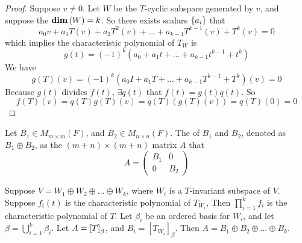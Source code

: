 \begin{proof}
    Suppose $v \neq 0$. Let $W$ be the $T$-cyclic subspace generated by $v$, and suppose the $\displaystyle \mathbf{dim}\left( W \right) =k$. So there exists scalars $\set{a_i}$ that 
    \begin{equation*}
        a_0 v + a_1 T(v) + a_2 T^2(v) + \dots + a_{k-1} T^{k-1}(v) + T^k(v) = 0
    \end{equation*}
    which implies the characteristic polynomial of $T_W$ is
    \begin{equation*}
        g(t) = (-1)^k \left(a_0 + a_1 t + \dots + a_{k-1} t^{k-1} + t^k \right)
    \end{equation*}
    We have
    \begin{equation*}
        g(T)(v) = (-1)^k \left(a_0 I + a_1 T + \dots + a_{k-1} T^{k-1} + T^k \right)(v) = 0
    \end{equation*}
    Because $g(t)$ divides $f(t)$, $\exists q(t)$ that $f(t) = g(t) q(t)$. So
    \begin{equation*}
        f(T)(v) = q(T)g(T)(v) = q(T) \left(g(T)(v)\right) = q(T)(0) = 0
    \end{equation*}
\end{proof}



\begin{definition}
    Let $B_1 \in M_{m \times m}(F)$, and $B_2 \in M_{n \times n} (F)$. The  of $B_1$ and $B_2$, denoted as $B_1 \oplus B_2$, as the $(m+n) \times (m+n)$ matrix $A$ that
    \begin{equation*}
        A = \begin{pmatrix}
            B_1 & 0 \\
            0 & B_2
        \end{pmatrix}
    \end{equation*}
\end{definition}


\begin{theorem}
    Suppose $V=W_1 \oplus W_2 \oplus \dots \oplus W_k$, where $W_i$ is a $T$-invariant subspace of $V$. Suppose $f_i(t)$ is the characteristic polynomial of $T_{W_i}$, Then $\displaystyle \prod_{i=1}^k f_i$ is the characteristic polynomial of $T$. Let $\beta_i$ be an ordered basis for $W_i$, and let $\displaystyle \beta = \bigcup_{i=1}^k \beta_i$. Let $A=\coordinate{T}_\beta$, and $B_i=[T_{W_i}]_\beta$. Then $A = B_1 \oplus B_2 \oplus \dots \oplus B_k$.
\end{theorem}



